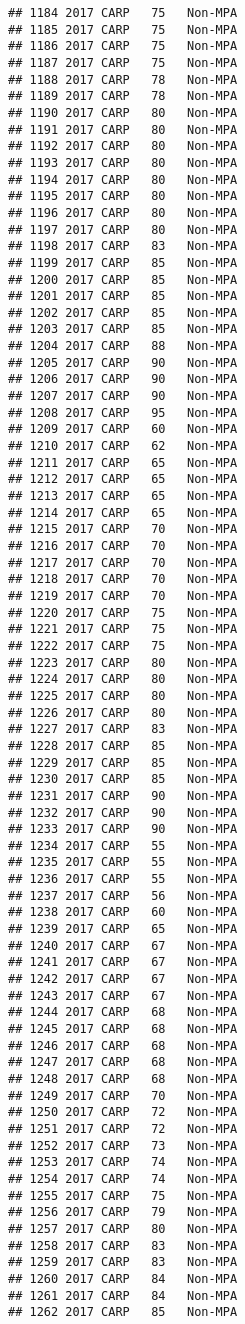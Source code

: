 \documentclass[]{article}
\begin{document}
\begin{verbatim}
## 1184 2017 CARP   75   Non-MPA
## 1185 2017 CARP   75   Non-MPA
## 1186 2017 CARP   75   Non-MPA
## 1187 2017 CARP   75   Non-MPA
## 1188 2017 CARP   78   Non-MPA
## 1189 2017 CARP   78   Non-MPA
## 1190 2017 CARP   80   Non-MPA
## 1191 2017 CARP   80   Non-MPA
## 1192 2017 CARP   80   Non-MPA
## 1193 2017 CARP   80   Non-MPA
## 1194 2017 CARP   80   Non-MPA
## 1195 2017 CARP   80   Non-MPA
## 1196 2017 CARP   80   Non-MPA
## 1197 2017 CARP   80   Non-MPA
## 1198 2017 CARP   83   Non-MPA
## 1199 2017 CARP   85   Non-MPA
## 1200 2017 CARP   85   Non-MPA
## 1201 2017 CARP   85   Non-MPA
## 1202 2017 CARP   85   Non-MPA
## 1203 2017 CARP   85   Non-MPA
## 1204 2017 CARP   88   Non-MPA
## 1205 2017 CARP   90   Non-MPA
## 1206 2017 CARP   90   Non-MPA
## 1207 2017 CARP   90   Non-MPA
## 1208 2017 CARP   95   Non-MPA
## 1209 2017 CARP   60   Non-MPA
## 1210 2017 CARP   62   Non-MPA
## 1211 2017 CARP   65   Non-MPA
## 1212 2017 CARP   65   Non-MPA
## 1213 2017 CARP   65   Non-MPA
## 1214 2017 CARP   65   Non-MPA
## 1215 2017 CARP   70   Non-MPA
## 1216 2017 CARP   70   Non-MPA
## 1217 2017 CARP   70   Non-MPA
## 1218 2017 CARP   70   Non-MPA
## 1219 2017 CARP   70   Non-MPA
## 1220 2017 CARP   75   Non-MPA
## 1221 2017 CARP   75   Non-MPA
## 1222 2017 CARP   75   Non-MPA
## 1223 2017 CARP   80   Non-MPA
## 1224 2017 CARP   80   Non-MPA
## 1225 2017 CARP   80   Non-MPA
## 1226 2017 CARP   80   Non-MPA
## 1227 2017 CARP   83   Non-MPA
## 1228 2017 CARP   85   Non-MPA
## 1229 2017 CARP   85   Non-MPA
## 1230 2017 CARP   85   Non-MPA
## 1231 2017 CARP   90   Non-MPA
## 1232 2017 CARP   90   Non-MPA
## 1233 2017 CARP   90   Non-MPA
## 1234 2017 CARP   55   Non-MPA
## 1235 2017 CARP   55   Non-MPA
## 1236 2017 CARP   55   Non-MPA
## 1237 2017 CARP   56   Non-MPA
## 1238 2017 CARP   60   Non-MPA
## 1239 2017 CARP   65   Non-MPA
## 1240 2017 CARP   67   Non-MPA
## 1241 2017 CARP   67   Non-MPA
## 1242 2017 CARP   67   Non-MPA
## 1243 2017 CARP   67   Non-MPA
## 1244 2017 CARP   68   Non-MPA
## 1245 2017 CARP   68   Non-MPA
## 1246 2017 CARP   68   Non-MPA
## 1247 2017 CARP   68   Non-MPA
## 1248 2017 CARP   68   Non-MPA
## 1249 2017 CARP   70   Non-MPA
## 1250 2017 CARP   72   Non-MPA
## 1251 2017 CARP   72   Non-MPA
## 1252 2017 CARP   73   Non-MPA
## 1253 2017 CARP   74   Non-MPA
## 1254 2017 CARP   74   Non-MPA
## 1255 2017 CARP   75   Non-MPA
## 1256 2017 CARP   79   Non-MPA
## 1257 2017 CARP   80   Non-MPA
## 1258 2017 CARP   83   Non-MPA
## 1259 2017 CARP   83   Non-MPA
## 1260 2017 CARP   84   Non-MPA
## 1261 2017 CARP   84   Non-MPA
## 1262 2017 CARP   85   Non-MPA

\end{verbatim}
\end{document}
